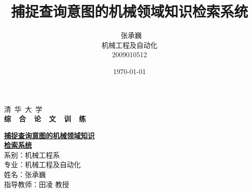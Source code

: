 \documentclass[12pt,a4paper]{article}
\title{\yihao\textbf{捕捉查询意图的机械领域知识检索系统}}
\author{\xiaosihao\ 张承巍\\机械工程及自动化\\2009010512}
\date{\today}
\newcommand{\xiaochu}{\fontsize{36pt}{\baselineskip}\selectfont}
\newcommand{\yihao}{\fontsize{26pt}{\baselineskip}\selectfont}
\newcommand{\erhao}{\fontsize{22pt}{\baselineskip}\selectfont}
\newcommand{\sanhao}{\fontsize{16pt}{\baselineskip}\selectfont}
\newcommand{\xiaosanhao}{\fontsize{15pt}{\baselineskip}\selectfont}
\renewcommand{\today}{\number\year \ 年\ \number\month \ 月\ \number\day \ 日}
\begin{document}
\begin{titlepage}
\begin{center}


\phantom{Start!}

\vspace{1cm} 

{\yihao \lishu 清\ 华\ 大\ 学}\\[1.5cm]

\textbf{\xiaochu \bfseries {综\ \ 合\ \ 论\ \ 文\ \ 训\ \ 练} }\\[2.5cm]

\end{center}
\textbf{\erhao{题目：}\yihao \underline{捕捉查询意图的机械领域知识}\\ \hspace*{21mm} \underline{检索系统}}\\[4cm]




{
\FangSong \sanhao 
\hspace{11mm}系\hspace{11mm}别：机械工程系\\[0.25cm]

\hspace{11mm}专\hspace{11mm}业：机械工程及自动化\\[0.25cm]

\hspace{11mm}姓\hspace{11mm}名：张承巍\\[0.25cm]

\hspace{11mm}指导教师：田\quad 凌 教授\\[2cm]

}



\center{\SimSun \large \today}





\end{titlepage}



\renewcommand\abstractname{\xiaosanhao 中文摘要}

\phantom{Start!}
\end{document}
